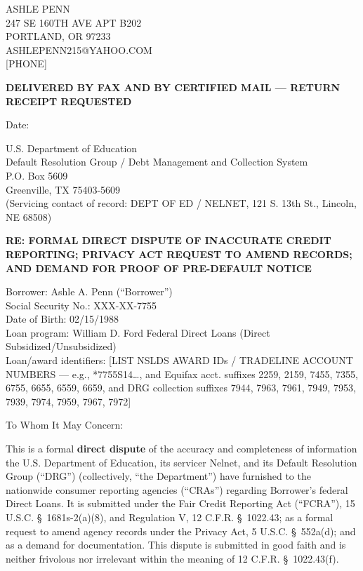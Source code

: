 \documentclass[11pt]{article}
\begin{document}
\pagestyle{plain}

\noindent
ASHLE PENN\\
247 SE 160TH AVE APT B202\\
PORTLAND, OR 97233\\
ASHLEPENN215@YAHOO.COM\\
{[}PHONE{]}

\vspace{1em}
\noindent
\textbf{DELIVERED BY FAX AND BY CERTIFIED MAIL --- RETURN RECEIPT REQUESTED}

\vspace{1em}
\noindent
Date: \underline{\hspace{5cm}}

\vspace{1em}
\noindent
U.S. Department of Education\\
Default Resolution Group / Debt Management and Collection System\\
P.O. Box 5609\\
Greenville, TX 75403-5609\\
(Servicing contact of record: DEPT OF ED / NELNET, 121 S. 13th St., Lincoln, NE 68508)

\vspace{1em}
\noindent
\textbf{RE: FORMAL DIRECT DISPUTE OF INACCURATE CREDIT REPORTING; PRIVACY ACT REQUEST TO AMEND RECORDS; AND DEMAND FOR PROOF OF PRE-DEFAULT NOTICE}

\vspace{0.5em}
\noindent
Borrower: Ashle A. Penn (``Borrower'')\\
Social Security No.: XXX-XX-7755\\
Date of Birth: 02/15/1988\\
Loan program: William D. Ford Federal Direct Loans (Direct Subsidized/Unsubsidized)\\
Loan/award identifiers: {[}LIST NSLDS AWARD IDs / TRADELINE ACCOUNT NUMBERS --- e.g., *7755S14\ldots, and Equifax acct. suffixes 2259, 2159, 7455, 7355, 6755, 6655, 6559, 6659, and DRG collection suffixes 7944, 7963, 7961, 7949, 7953, 7939, 7974, 7959, 7967, 7972{]}

\hrulefill

\vspace{0.5em}
\noindent To Whom It May Concern:

\vspace{0.5em}
This is a formal \textbf{direct dispute} of the accuracy and completeness of information the U.S. Department of Education, its servicer Nelnet, and its Default Resolution Group (``DRG'') (collectively, ``the Department'') have furnished to the nationwide consumer reporting agencies (``CRAs'') regarding Borrower's federal Direct Loans. It is submitted under the Fair Credit Reporting Act (``FCRA''), 15 U.S.C. \S~1681s-2(a)(8), and Regulation V, 12 C.F.R. \S~1022.43; as a formal request to amend agency records under the Privacy Act, 5 U.S.C. \S~552a(d); and as a demand for documentation. This dispute is submitted in good faith and is neither frivolous nor irrelevant within the meaning of 12 C.F.R. \S~1022.43(f).
\end{document}
